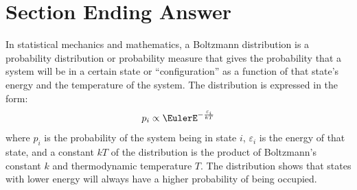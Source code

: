 \documentclass[12pt]{article}
\begin{document}




\section*{Section Ending Answer}

In statistical mechanics and mathematics, a Boltzmann distribution is a
probability distribution or probability measure that gives the
probability that a system will be in a certain state or
``configuration'' as a function of that state's energy and the
temperature of the system.  The distribution is expressed in the form:
\[
    p_{i}\propto \EulerE^{-{\frac {\varepsilon _{i}}{kT}}}
\] where \( p_i \) is the probability of the system being in state \( i \),
\( \varepsilon_i \) is the energy of that state, and a constant \( kT \)
of the distribution is the product of Boltzmann's constant \( k \) and
thermodynamic temperature \( T \).  The distribution shows that states
with lower energy will always have a higher probability of being
occupied.
\end{document}
